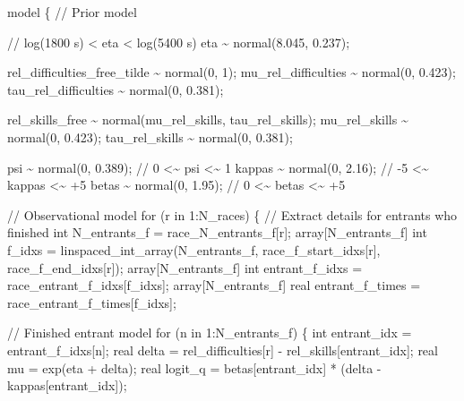 \documentclass[
  letterpaper,
  DIV=11,
  numbers=noendperiod]{scrartcl}
\newenvironment{Shaded}{\begin{snugshade}}{\end{snugshade}}
\newcommand{\CommentTok}[1]{\textcolor[rgb]{0.37,0.37,0.37}{#1}}
\newcommand{\ControlFlowTok}[1]{\textcolor[rgb]{0.00,0.23,0.31}{#1}}
\newcommand{\DataTypeTok}[1]{\textcolor[rgb]{0.68,0.00,0.00}{#1}}
\newcommand{\DecValTok}[1]{\textcolor[rgb]{0.68,0.00,0.00}{#1}}
\newcommand{\FloatTok}[1]{\textcolor[rgb]{0.68,0.00,0.00}{#1}}
\newcommand{\KeywordTok}[1]{\textcolor[rgb]{0.00,0.23,0.31}{#1}}
\newcommand{\NormalTok}[1]{\textcolor[rgb]{0.00,0.23,0.31}{#1}}
\begin{document}
\begin{codelisting}
\begin{Shaded}
\begin{Highlighting}[]
\KeywordTok{model}\NormalTok{ \{}
  \CommentTok{// Prior model}

  \CommentTok{// log(1800 s) \textless{} eta \textless{} log(5400 s)}
\NormalTok{  eta \textasciitilde{} normal(}\FloatTok{8.045}\NormalTok{, }\FloatTok{0.237}\NormalTok{);}

\NormalTok{  rel\_difficulties\_free\_tilde \textasciitilde{} normal(}\DecValTok{0}\NormalTok{, }\DecValTok{1}\NormalTok{);}
\NormalTok{  mu\_rel\_difficulties \textasciitilde{} normal(}\DecValTok{0}\NormalTok{, }\FloatTok{0.423}\NormalTok{);}
\NormalTok{  tau\_rel\_difficulties \textasciitilde{} normal(}\DecValTok{0}\NormalTok{, }\FloatTok{0.381}\NormalTok{);}

\NormalTok{  rel\_skills\_free \textasciitilde{} normal(mu\_rel\_skills, tau\_rel\_skills);}
\NormalTok{  mu\_rel\_skills \textasciitilde{} normal(}\DecValTok{0}\NormalTok{, }\FloatTok{0.423}\NormalTok{);}
\NormalTok{  tau\_rel\_skills \textasciitilde{} normal(}\DecValTok{0}\NormalTok{, }\FloatTok{0.381}\NormalTok{);}

\NormalTok{  psi \textasciitilde{} normal(}\DecValTok{0}\NormalTok{, }\FloatTok{0.389}\NormalTok{);   }\CommentTok{//  0 \textless{}\textasciitilde{} psi    \textless{}\textasciitilde{} 1}
\NormalTok{  kappas \textasciitilde{} normal(}\DecValTok{0}\NormalTok{, }\FloatTok{2.16}\NormalTok{); }\CommentTok{// {-}5 \textless{}\textasciitilde{} kappas \textless{}\textasciitilde{} +5}
\NormalTok{  betas \textasciitilde{} normal(}\DecValTok{0}\NormalTok{, }\FloatTok{1.95}\NormalTok{);  }\CommentTok{//  0 \textless{}\textasciitilde{} betas  \textless{}\textasciitilde{} +5}

  \CommentTok{// Observational model}
  \ControlFlowTok{for}\NormalTok{ (r }\ControlFlowTok{in} \DecValTok{1}\NormalTok{:N\_races) \{}
    \CommentTok{// Extract details for entrants who finished}
    \DataTypeTok{int}\NormalTok{ N\_entrants\_f = race\_N\_entrants\_f[r];}
    \DataTypeTok{array}\NormalTok{[N\_entrants\_f] }\DataTypeTok{int}\NormalTok{ f\_idxs}
\NormalTok{      = linspaced\_int\_array(N\_entrants\_f,}
\NormalTok{                            race\_f\_start\_idxs[r],}
\NormalTok{                            race\_f\_end\_idxs[r]);}
    \DataTypeTok{array}\NormalTok{[N\_entrants\_f] }\DataTypeTok{int}\NormalTok{ entrant\_f\_idxs}
\NormalTok{      = race\_entrant\_f\_idxs[f\_idxs];}
    \DataTypeTok{array}\NormalTok{[N\_entrants\_f] }\DataTypeTok{real}\NormalTok{ entrant\_f\_times}
\NormalTok{      = race\_entrant\_f\_times[f\_idxs];}

    \CommentTok{// Finished entrant model}
    \ControlFlowTok{for}\NormalTok{ (n }\ControlFlowTok{in} \DecValTok{1}\NormalTok{:N\_entrants\_f) \{}
      \DataTypeTok{int}\NormalTok{ entrant\_idx = entrant\_f\_idxs[n];}
      \DataTypeTok{real}\NormalTok{ delta = rel\_difficulties[r] {-} rel\_skills[entrant\_idx];}
      \DataTypeTok{real}\NormalTok{ mu = exp(eta + delta);}
      \DataTypeTok{real}\NormalTok{ logit\_q = betas[entrant\_idx] * (delta {-} kappas[entrant\_idx]);}


\end{Highlighting}
\end{Shaded}
\end{codelisting}
\end{document}
